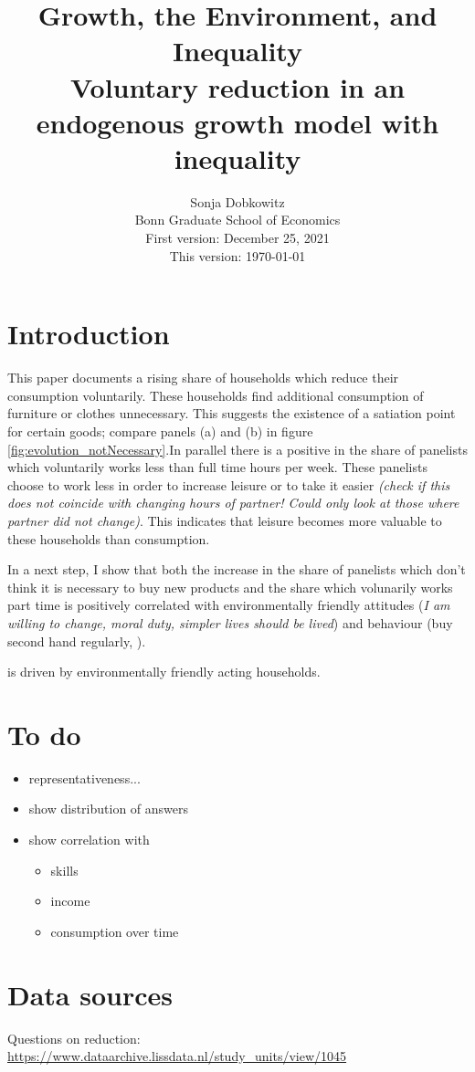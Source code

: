 \documentclass[12pt]{article}
\title{Growth, the Environment, and Inequality\\ \small{ Voluntary reduction in an endogenous growth model with inequality}}
\date{Sonja Dobkowitz\\ Bonn Graduate School of Economics\\ %
	\vspace{1mm}
	First version: December 25, 2021\\
	This version: \today }
\begin{document}
	\maketitle
	
\section{Introduction}
This paper documents a rising share of households which reduce their consumption voluntarily. These households find additional consumption of furniture or clothes unnecessary. This suggests the existence of a satiation point for certain goods; compare panels (a) and (b) in figure \ref{fig:evolution_notNecessary}.In parallel there is a positive in the share of panelists which voluntarily works less than full time hours per week. These panelists choose to work less in order to increase leisure or to take it easier \textit{(check if this does not coincide with changing hours of partner! Could only look at those where partner did not change)}. This indicates that leisure becomes more valuable to these households than consumption. 

In a next step, I show that both the increase in the share of panelists which don't think it is necessary to buy new products and the share which volunarily works part time is positively correlated with environmentally friendly attitudes (\textit{I am willing to change, moral duty, simpler lives should be lived}) and behaviour (buy second hand regularly, ). 

 is driven by environmentally friendly acting households.
\section{To do}
\begin{itemize}
	\item representativeness...
	\item show distribution of answers
	\item show correlation with 
	\begin{itemize}
		\item skills
		\item income
		\item consumption over time
	\end{itemize}
\end{itemize}

\section{Data sources}
Questions on reduction:
\url{https://www.dataarchive.lissdata.nl/study_units/view/1045}
\end{document}

